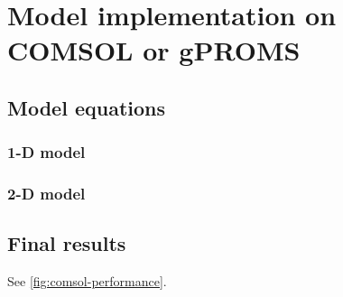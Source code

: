 \section{Model implementation on COMSOL or gPROMS}
\subsection{Model equations}
\subsubsection{1-D model}
\subsubsection{2-D model}




\subsection{Final results}
See \cref{fig:comsol-performance}.

